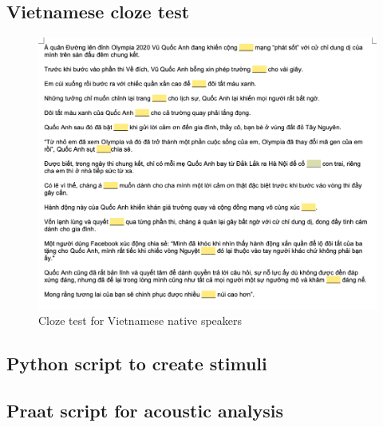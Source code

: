 \documentclass[a4paper]{article}
\begin{document}
\subsection{Vietnamese cloze test}
\begin{figure}[H]
\begin{center}  
\includegraphics[width=\linewidth]{vicloze} 
\caption{Cloze test for Vietnamese native speakers}
\label{fig:vi-cloze}
\end{center}   
\end{figure}

\subsection{Python script to create stimuli}

 

\subsection{Praat script for acoustic analysis}
 
\nocite{*}

{}
\end{document}
